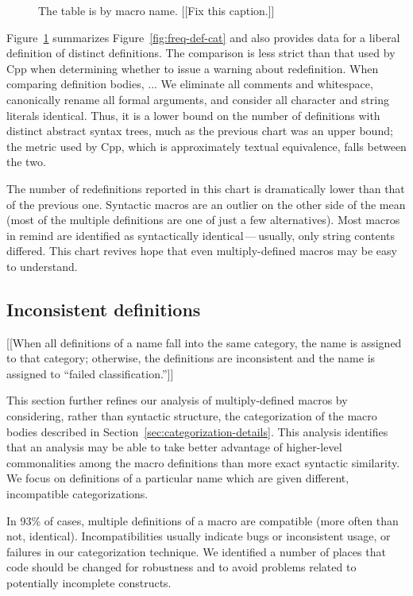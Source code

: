 \documentclass[10pt]{article}
\newcommand{\pkg}[1]{\textsf{#1}}
\newcommand{\captionsmall}[1]{\caption[]{\small #1}}
\begin{document}
\begin{figure}
  {\small\centerline{}}
  
  \captionsmall{The table is by macro name. [[Fix this caption.]]}
  \label{fig:freq-sum-cat}
\end{figure}


Figure~\ref{fig:freq-sum-cat} summarizes Figure~\ref{fig:freq-def-cat} and
also provides data for a liberal definition of distinct definitions.  The
comparison is less strict than that used by Cpp when determining whether to
issue a warning about redefinition.  When comparing definition bodies, ...
We eliminate all comments and whitespace, canonically rename all formal
arguments, and consider all character and string literals identical.  Thus,
it is a lower bound on the number of definitions with distinct abstract
syntax trees, much as the previous chart was an upper bound; the metric
used by Cpp, which is approximately textual equivalence, falls between the
two.

The number of redefinitions reported in this chart is dramatically lower
than that of the previous one.  Syntactic macros are an outlier on the
other side of the mean (most of the multiple definitions are one of just a
few alternatives).  Most macros in \pkg{remind} are identified as
syntactically identical\,---\,usually, only string contents differed.  This
chart revives hope that even multiply-defined macros may be easy to
understand.


\subsection{Inconsistent definitions}
\label{sec:inconsistent}

[[When all
definitions of a name fall into the same category, the name is assigned to
that category; otherwise, the definitions are inconsistent and the name is
assigned to ``failed classification.'']]

This section further refines our analysis of multiply-defined macros by
considering, rather than syntactic structure, the categorization of the
macro bodies described in Section~\ref{sec:categorization-details}.  This
analysis identifies that an analysis may be able to take better advantage
of higher-level commonalities among the macro definitions than more exact
syntactic similarity.  We focus on definitions of a particular name which
are given different, incompatible categorizations.

In 93\% of cases, multiple definitions of a macro are compatible (more
often than not, identical).  Incompatibilities usually indicate bugs or
inconsistent usage, or failures in our categorization technique.  We
identified a number of places that code should be changed for robustness
and to avoid problems related to potentially incomplete constructs.
\end{document}
